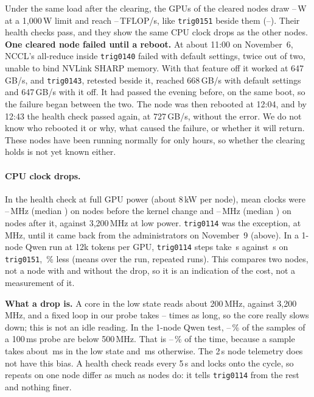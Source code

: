 Under the same load after the clearing, the GPUs of the \TriClearedNodes{} cleared nodes draw \TriClearedPowerLo--\TriClearedPowerHi\,W at a 1,000\,W limit and reach \TriClearedTFlopsLo--\TriClearedTFlopsHi\,TFLOP/s, like \texttt{trig0151} beside them (\TriClearedCtlLo--\TriClearedCtlHi). Their health checks pass, and they show the same CPU clock drops as the other nodes. \textbf{One cleared node failed until a reboot.} At about 11:00 on November~6, NCCL's all-reduce inside \texttt{trig0140} failed with default settings, twice out of two, unable to bind NVLink SHARP memory. With that feature off it worked at 647\,GB/s, and \texttt{trig0143}, retested beside it, reached 668\,GB/s with default settings and 647\,GB/s with it off. It had passed the evening before, on the same boot, so the failure began between the two. The node was then rebooted at 12:04, and by 12:43 the health check passed again, at 727\,GB/s, without the error. We do not know who rebooted it or why, what caused the failure, or whether it will return. These nodes have been running normally for only hours, so whether the clearing holds is not yet known either.

\paragraph{CPU clock drops.} In the health check at full GPU power (about 8\,kW per node), mean clocks were \TriCpuBeforeLo--\TriCpuBeforeHi\,MHz (median \TriCpuBeforeMed) on \TriCpuNodesBefore{} nodes before the
kernel change and \TriCpuAfterLo--\TriCpuAfterHi\,MHz (median \TriCpuAfterMed) on \TriCpuNodesAfter{} nodes after it, against 3,200\,MHz at low power. \texttt{trig0114} was the exception, at \TriCpuOddNode\,MHz, until it came back from the administrators on November~9 (above). In a 1-node Qwen run at 12k tokens per GPU, \texttt{trig0114}
steps take \TriThrottleOddStep\,s against \TriThrottleStep\,s on \texttt{trig0151}, \TriThrottlePct\,\% less (means over the run, repeated runs). This compares two nodes, not a node with and without the drop, so it is an indication of the cost, not a measurement of it.

\textbf{What a drop is.} A core in the low state reads about 200\,MHz, against 3,200\,MHz, and a fixed loop in our probe takes \TriLoopRatioLo--\TriLoopRatioHi{} times as long, so the core really slows down; this is not an idle reading. In the 1-node Qwen test, \TriProbeRowsLo--\TriProbeRowsHi\,\% of the samples of a 100\,ms probe are below 500\,MHz. That is \TriProbeTimeLo--\TriProbeTimeHi\,\% of the time, because a sample takes about \TriProbeLowMs\,ms in the low state and \TriProbeHighMs\,ms otherwise. The 2\,s node telemetry does not have this bias. A health check reads every 5\,s and locks onto the cycle, so repeats on one node differ as much as nodes do: it tells \texttt{trig0114} from the rest and nothing finer.

